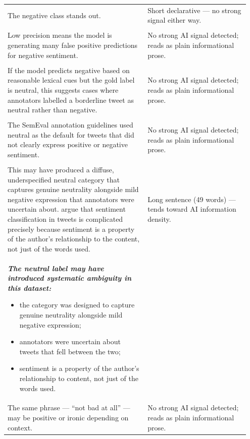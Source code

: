 \documentclass[11pt]{article}
\begin{document}
\begin{longtable}{|p{0.55\linewidth}|p{0.40\linewidth}|}
\hline
\rule{0pt}{3.5cm} & \\
\hline
The negative class stands out. & Short declarative --- no strong signal either way. \\[2pt]
\hline
\rule{0pt}{3.5cm} & \\
\hline
Low precision means the model is generating many false positive predictions for negative sentiment. & No strong AI signal detected; reads as plain informational prose. \\[2pt]
\hline
\rule{0pt}{3.5cm} & \\
\hline
If the model predicts negative based on reasonable lexical cues but the gold label is neutral, this suggests cases where annotators labelled a borderline tweet as neutral rather than negative. & No strong AI signal detected; reads as plain informational prose. \\[2pt]
\hline
\rule{0pt}{3.5cm} & \\
\hline
The SemEval annotation guidelines used neutral as the default for tweets that did not clearly express positive or negative sentiment. & No strong AI signal detected; reads as plain informational prose. \\[2pt]
\hline
\rule{0pt}{3.5cm} & \\
\hline
This may have produced a diffuse, underspecified neutral category that captures genuine neutrality alongside mild negative expression that annotators were uncertain about. argue that sentiment classification in tweets is complicated precisely because sentiment is a property of the author's relationship to the content, not just of the words used. & Long sentence (49 words) --- tends toward AI information density. \\[2pt]
\hline
{\bfseries\itshape The neutral label may have introduced systematic ambiguity in this dataset:
\begin{itemize}[leftmargin=*,topsep=2pt,itemsep=1pt,parsep=0pt]
  \item the category was designed to capture genuine neutrality alongside mild negative expression;
  \item annotators were uncertain about tweets that fell between the two;
  \item sentiment is a property of the author's relationship to content, not just of the words used.
\end{itemize}}\vspace{2em} & \\
\hline
The same phrase --- ``not bad at all'' --- may be positive or ironic depending on context. & No strong AI signal detected; reads as plain informational prose. \\[2pt]

\end{longtable}
\end{document}
